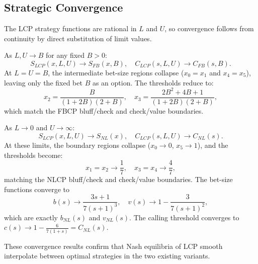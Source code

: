 \documentclass[../../main/main.tex]{subfiles}
\begin{document}
\subsection{Strategic Convergence}
\label{sec:strategic_convergence}

The LCP strategy functions are rational in $L$ and $U$, so convergence follows from continuity by direct substitution of limit values.

\begin{remark}
As $L, U \to B$ for any fixed $B > 0$:
\[
S_{LCP}(x, L, U) \to S_{FB}(x, B), \quad C_{LCP}(s, L, U) \to C_{FB}(s, B).
\]
At $L = U = B$, the intermediate bet-size regions collapse ($x_0 = x_1$ and $x_4 = x_5$), leaving only the fixed bet $B$ as an option. The thresholds reduce to:
\[
x_2 = \frac{B}{(1+2B)(2+B)}, \quad x_3 = \frac{2B^2+4B+1}{(1+2B)(2+B)},
\]
which match the FBCP bluff/check and check/value boundaries.
\end{remark}

\begin{remark}
As $L \to 0$ and $U \to \infty$:
\[
S_{LCP}(x, L, U) \to S_{NL}(x), \quad C_{LCP}(s, L, U) \to C_{NL}(s).
\]
At these limits, the boundary regions collapse ($x_0 \to 0$, $x_5 \to 1$), and the thresholds become:
\[
x_1 = x_2 \to \frac{1}{7}, \quad x_3 = x_4 \to \frac{4}{7},
\]
matching the NLCP bluff/check and check/value boundaries. The bet-size functions converge to
\[
b(s) \to \frac{3s+1}{7(s+1)^3}, \quad v(s) \to 1 - \frac{3}{7(s+1)^2},
\]
which are exactly $b_{NL}(s)$ and $v_{NL}(s)$. The calling threshold converges to $c(s) \to 1 - \frac{6}{7(1+s)} = C_{NL}(s)$.
\end{remark}

These convergence results confirm that Nash equilibria of LCP smooth interpolate between optimal strategies in the two existing variants.
\end{document}
